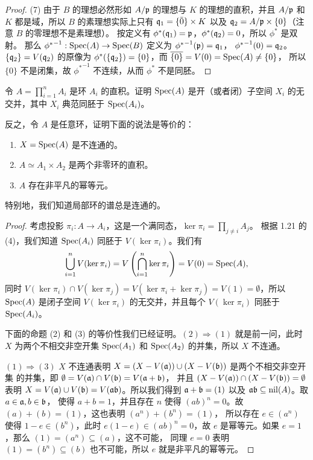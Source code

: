 \begin{proof}
  (7) 由于 $B$ 的理想必然形如 $A/\mathfrak{p}$ 的理想与 $K$ 的理想的直积，并且
  $A/\mathfrak{p}$ 和 $K$ 都是域，所以 $B$ 的素理想实际上只有
  $\mathfrak{q}_1=\{\bar{0}\}\times K$ 以及 $\mathfrak{q}_2=A/\mathfrak{p}\times\{0\}$（注意 $B$ 的零理想不是素理想）。
  按定义有 $\phi^*(\mathfrak{q}_1)=\mathfrak{p}$，$\phi^*(\mathfrak{q}_2)=0$，所以 $\phi^*$ 是双射。
  那么 ${\phi^*}^{-1}:\operatorname{Spec}(A)\to \operatorname{Spec}(B)$ 定义为 ${\phi^*}^{-1}(\mathfrak{p})=\mathfrak{q}_1$，
  ${\phi^*}^{-1}(0)=\mathfrak{q}_2$。$\{\mathfrak{q}_2\}=V(\mathfrak{q}_2)$ 的原像为
  $\phi^*(\{\mathfrak{q}_2\})=\{0\}$，而 $\overline{\{0\}}=V(0)=\operatorname{Spec}(A)\neq\{0\}$，
  所以 $\{0\}$ 不是闭集，故 ${\phi^*}^{-1}$ 不连续，从而 $\phi^*$ 不是同胚。
\end{proof} 

\begin{problem}
  令 $A=\prod_{i=1}^n A_i$ 是环 $A_i$ 的直积。证明 $\operatorname{Spec}(A)$ 是开（或者闭）子空间
  $X_i$ 的无交并，其中 $X_i$ 典范同胚于 $\operatorname{Spec}(A_i)$。

  反之，令 $A$ 是任意环，证明下面的说法是等价的：
  \begin{enumerate}
    \item $X=\operatorname{Spec}(A)$ 是不连通的。
    \item $A\simeq A_1\times A_2$ 是两个非零环的直积。
    \item $A$ 存在非平凡的幂等元。
  \end{enumerate}
  特别地，我们知道局部环的谱总是连通的。
\end{problem}
\begin{proof}
  考虑投影 $\pi_i:A\to A_i$，这是一个满同态，$\ker\pi_i=\prod_{j\neq i} A_j$。
  根据 1.21 的 (4)，我们知道 $\operatorname{Spec}(A_i)$ 同胚于 $V(\ker\pi_i)$。我们有
  \[
    \bigcup_{i=1}^n V(\ker\pi_i)  
    =V\left(\bigcap_{i=1}^n\ker\pi_i\right)
    =V(0)=\operatorname{Spec}(A),
  \]
  同时 $V(\ker\pi_i)\cap V(\ker\pi_j)=V(\ker\pi_i+ \ker\pi_j)=V(1)=\emptyset$，所以
  $\operatorname{Spec}(A)$ 是闭子空间 $V(\ker\pi_i)$ 的无交并，并且每个 $V(\ker\pi_i)$ 同胚于 $\operatorname{Spec}(A_i)$。

  下面的命题 (2) 和 (3) 的等价性我们已经证明。$(2)\Rightarrow (1)$ 就是前一问，此时
  $X$ 为两个不相交非空开集 $\operatorname{Spec}(A_1)$ 和 $\operatorname{Spec}(A_2)$ 的并集，所以 $X$ 不连通。

  $(1)\Rightarrow (3)$ $X$ 不连通表明 $X=(X-V(\mathfrak{a}))\cup (X-V(\mathfrak{b}))$ 是两个不相交非空开集
  的并集，即 $\emptyset=V(\mathfrak{a})\cap V(\mathfrak{b})=V(\mathfrak{a}+\mathfrak{b})$，
  并且 $(X-V(\mathfrak{a}))\cap (X-V(\mathfrak{b}))=\emptyset$ 
  表明 $X=V(\mathfrak{a})\cup V(\mathfrak{b})=V(\mathfrak{ab})$。所以我们得到
  $\mathfrak{a}+\mathfrak{b}=(1)$ 以及 $\mathfrak{ab}\subseteq\operatorname{nil}(A)$。取 $a\in\mathfrak{a},b\in\mathfrak{b}$，
  使得 $a+b=1$，并且存在 $n$ 使得 $(ab)^n=0$。故 $(a)+(b)=(1)$，这也表明 $(a^n)+(b^n)=(1)$，
  所以存在 $e\in (a^n)$ 使得 $1-e\in (b^n)$，此时 $e(1-e)\in (ab)^n=0$，故 $e$
  是幂等元。如果 $e=1$，那么 $(1)= (a^n)\subseteq (a)$，这不可能，
  同理 $e=0$ 表明 $(1)=(b^n)\subseteq (b)$ 也不可能，所以 $e$ 就是非平凡的幂等元。
\end{proof}

